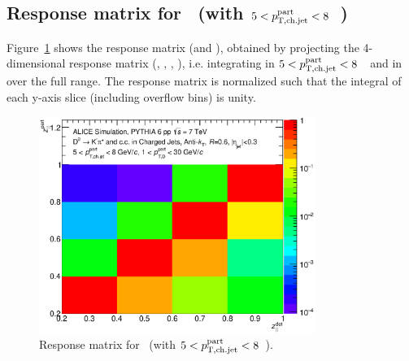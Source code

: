 \subsection{Response matrix for \zpar\ (with $5<p_{\mathrm{T,ch.jet}}^{\mathrm{part}}<8$~\GeVc)}
Figure~\ref{fig:D0_Full_R060_ResponseMatrix_Z_JetPt_5_8_DPt_01_30_Norm} shows the response matrix (\zpargen and \zpardet), obtained by
projecting the 4-dimensional response matrix (\zpargen, \ptchjetgen, \zpardet, \ptchjetdet), i.e. integrating in $5<p_{\mathrm{T,ch.jet}}^{\mathrm{part}}<8$~\GeVc\ and in  \ptchjetdet over the
full range.
The response matrix is normalized such that the integral of each y-axis slice (including overflow bins) is unity.
\begin{figure}[tbh]
\begin{center}
\includegraphics[width=0.8\textwidth]{img/D0_Full_R060_ResponseMatrix_Z_JetPt_5_8_DPt_01_30_Norm}
 \caption{Response matrix for \zpar\ (with $5<p_{\mathrm{T,ch.jet}}^{\mathrm{part}}<8$~\GeVc).} 
 \label{fig:D0_Full_R060_ResponseMatrix_Z_JetPt_5_8_DPt_01_30_Norm}
\end{center}
\end{figure}
